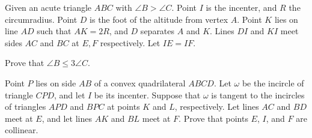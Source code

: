 \item[\textbf{G7.}]
Given an acute triangle 
$ ABC$
 with 
$ \angle B > \angle C$.
 Point 
$ I$
 is the incenter, and 
$ R$
 the circumradius. Point 
$ D$
 is the foot of the altitude from vertex 
$ A$.
 Point 
$ K$
 lies on line 
$ AD$
 such that 
$ AK = 2R$, 
 and 
$ D$
 separates 
$ A$
 and 
$ K$.
 Lines 
$ DI$
 and 
$ KI$
 meet sides 
$ AC$
 and 
$ BC$
 at 
$ E,F$
 respectively. Let 
$ IE = IF$.


Prove that 
$ \angle B\leq 3\angle C$.

\item[\textbf{G8.}]
Point 
$ P$
 lies on side 
$ AB$
 of a convex quadrilateral 
$ ABCD$.
 Let 
$ \omega$
 be the incircle of triangle 
$ CPD$, 
 and let 
$ I$
 be its incenter. Suppose that 
$ \omega$
 is tangent to the incircles of triangles 
$ APD$
 and 
$ BPC$
 at points 
$ K$
 and 
$ L$, 
 respectively. Let lines 
$ AC$
 and 
$ BD$
 meet at 
$ E$, 
 and let lines 
$ AK$
 and 
$ BL$
 meet at 
$ F$.
 Prove that points 
$ E$, 
$ I$, 
 and 
$ F$
 are collinear.


